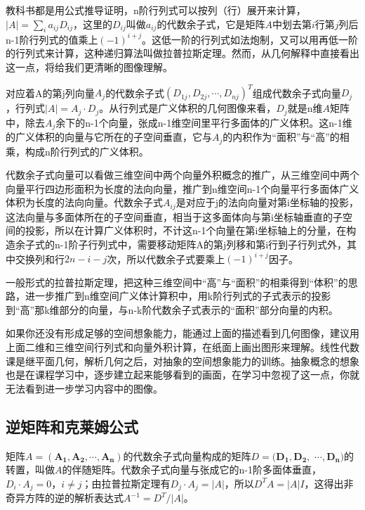 	教科书都是用公式推导证明，n阶行列式可以按列（行）展开来计算，$ |A| = \sum_{i}a_{ij}D_{ij} $，这里的$ D_{ij} $叫做$ a_{ij} $的代数余子式，它是矩阵$ A $中划去第$ i $行第$ j $列后n-1阶行列式的值乘上$ (-1)^{i+j} $。这低一阶的行列式如法炮制，又可以用再低一阶的行列式来计算，这种递归算法叫做拉普拉斯定理。然而，从几何解释中直接看出这一点，将给我们更清晰的图像理解。
	
	对应着A的第j列向量$ A_j $的代数余子式$  (D_{1j},D_{2j}, \cdots, D_{nj})^T $组成代数余子式向量$ D_j $，行列式$ |A|=A_j\cdot D_j $。从行列式是广义体积的几何图像来看，$ D_j $就是n维$ A $矩阵中，除去$ A_j $余下的n-1个向量，张成n-1维空间里平行多面体的广义体积。这n-1维的广义体积的向量与它所在的子空间垂直，它与$ A_j $的内积作为“面积”与“高”的相乘，构成n阶行列式的广义体积。
	
	代数余子式向量可以看做三维空间中两个向量外积概念的推广，从三维空间中两个向量平行四边形面积为长度的法向向量，推广到n维空间n-1个向量平行多面体广义体积为长度的法向向量。代数余子式$ A_{ij} $是对应于j的法向向量对第i坐标轴的投影，这法向量与多面体所在的子空间垂直，相当于这多面体向与第i坐标轴垂直的子空间的投影，所以在计算广义体积时，不计这n-1个向量在第i坐标轴上的分量，在构造余子式的n-1阶子行列式中，需要移动矩阵A的第j列移和第i行到子行列式外，其中交换列和行$ 2n-i-j $次，所以代数余子式要乘上$ (-1)^{i+j} $因子。
	
	一般形式的拉普拉斯定理，把这种三维空间中“高”与“面积”的相乘得到“体积”的思路，进一步推广到n维空间广义体计算积中，用k阶行列式的子式表示的投影到“高”那k维部分的向量，与n-k阶代数余子式表示的“面积”部分向量的内积。
	
	如果你还没有形成足够的空间想象能力，能通过上面的描述看到几何图像，建议用上面二维和三维空间行列式和向量外积计算，在纸面上画出图形来理解。线性代数课是继平面几何，解析几何之后，对抽象的空间想象能力的训练。抽象概念的想象也是在课程学习中，逐步建立起来能够看到的画面，在学习中忽视了这一点，你就无法看到进一步学习内容中的图像。
	
	\subsection{逆矩阵和克莱姆公式}
	
	矩阵$ A = (\mathbf{A_1},\mathbf{ A_2}, \cdots,\mathbf{A_n}) $的代数余子式向量构成的矩阵$ D = (\mathbf{D_1}, \mathbf{D_2},$  $\cdots,\mathbf{D_n}) $的转置，叫做$ A $的伴随矩阵。代数余子式向量与张成它的n-1阶多面体垂直，$ D_i·A_j = 0，i \neq j $；由拉普拉斯定理有$ D_j\cdot A_j = |A| $，所以$ D^TA = |A|I $，这得出非奇异方阵的逆的解析表达式$  A^{-1} = D^T/|A| $。
	
